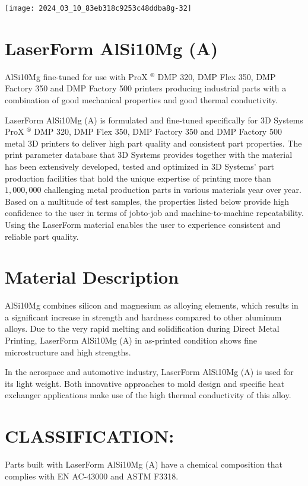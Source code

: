 \documentclass[10pt]{article}
\begin{document}
\begin{center}
\texttt{[image: 2024\_03\_10\_83eb318c9253c48ddba8g-32]}
\end{center}

\section*{LaserForm AlSi10Mg (A)}
AlSi10Mg fine-tuned for use with ProX ${ }^{\circledR}$ DMP 320, DMP Flex 350, DMP Factory 350 and DMP Factory 500 printers producing industrial parts with a combination of good mechanical properties and good thermal conductivity.

LaserForm AlSi10Mg (A) is formulated and fine-tuned specifically for 3D Systems ProX ${ }^{\circledR}$ DMP 320, DMP Flex 350, DMP Factory 350 and DMP Factory 500 metal 3D printers to deliver high part quality and consistent part properties. The print parameter database that 3D Systems provides together with the material has been extensively developed, tested and optimized in 3D Systems' part production facilities that hold the unique expertise of printing more than $1,000,000$ challenging metal production parts in various materials year over year. Based on a multitude of test samples, the properties listed below provide high confidence to the user in terms of jobto-job and machine-to-machine repeatability. Using the LaserForm material enables the user to experience consistent and reliable part quality.

\section*{Material Description}
AlSi10Mg combines silicon and magnesium as alloying elements, which results in a significant increase in strength and hardness compared to other aluminum alloys. Due to the very rapid melting and solidification during Direct Metal Printing, LaserForm AlSi10Mg (A) in as-printed condition shows fine microstructure and high strengths.

In the aerospace and automotive industry, LaserForm AlSi10Mg (A) is used for its light weight. Both innovative approaches to mold design and specific heat exchanger applications make use of the high thermal conductivity of this alloy.

\section*{CLASSIFICATION:}
Parts built with LaserForm AlSi10Mg (A) have a chemical composition that complies with EN AC-43000 and ASTM F3318.
\end{document}
